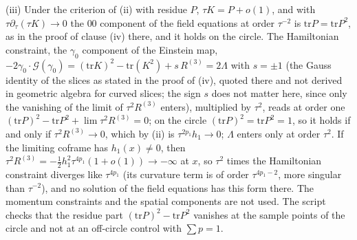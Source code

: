 (iii) Under the criterion of (ii) with residue $P$, $\tau K = P + o(1)$, and with $\tau\partial_{\tau}(\tau K) \to 0$ the $00$ component of the field equations at order $\tau^{-2}$ is $\mathrm{tr}P = \mathrm{tr}P^{2}$, as in the proof of clause (iv) there, and it holds on the circle. The Hamiltonian constraint, the $\gamma_{0}$ component of the Einstein map, $-2\gamma_{0}\cdot\mathcal{G}(\gamma_{0}) = (\mathrm{tr}K)^{2} - \mathrm{tr}(K^{2}) + s\,R^{(3)} = 2\Lambda$ with $s = \pm 1$ (the Gauss identity of the slices as stated in the proof of (iv), quoted there and not derived in geometric algebra for curved slices; the sign $s$ does not matter here, since only the vanishing of the limit of $\tau^{2}R^{(3)}$ enters), multiplied by $\tau^{2}$, reads at order one $(\mathrm{tr}P)^{2} - \mathrm{tr}P^{2} + \lim\tau^{2}R^{(3)} = 0$; on the circle $(\mathrm{tr}P)^{2} = \mathrm{tr}P^{2} = 1$, so it holds if and only if $\tau^{2}R^{(3)} \to 0$, which by (ii) is $\tau^{2p_{1}}h_{1} \to 0$; $\Lambda$ enters only at order $\tau^{2}$. If the limiting coframe has $h_{1}(x) \neq 0$, then $\tau^{2}R^{(3)} = -\tfrac12 h_{1}^{2}\tau^{4p_{1}}(1 + o(1)) \to -\infty$ at $x$, so $\tau^{2}$ times the Hamiltonian constraint diverges like $\tau^{4p_{1}}$ (its curvature term is of order $\tau^{4p_{1} - 2}$, more singular than $\tau^{-2}$), and no solution of the field equations has this form there. The momentum constraints and the spatial components are not used. The script checks that the residue part $(\mathrm{tr}P)^{2} - \mathrm{tr}P^{2}$ vanishes at the sample points of the circle and not at an off-circle control with $\sum p = 1$.

